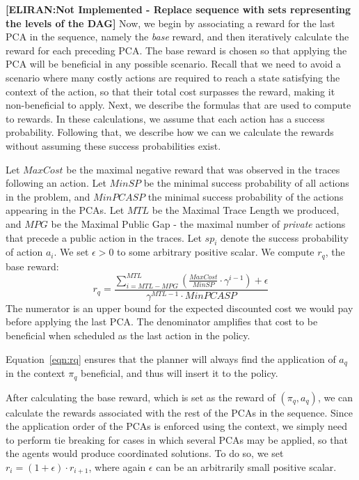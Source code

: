 \documentclass[letterpaper]{article} %
\newcommand{\eliran}[1]{\textbf{[\color{red}ELIRAN:#1]}}
\begin{document}
\eliran{Not Implemented - Replace sequence with sets representing the levels of the DAG}
Now, we begin by associating a reward for the last PCA in the sequence, namely the \emph{base} reward, and then iteratively calculate the reward for each preceding PCA.
The base reward is chosen so that applying the PCA will be beneficial in any possible scenario. Recall that we need to avoid a scenario where many costly actions are required to reach a state satisfying the context of the action, so that their total cost surpasses the reward, making it non-beneficial to apply.
Next, we describe the formulas that are used to compute to rewards. In these calculations, we assume that each action has a success probability. Following that, we describe how we can we calculate the rewards without assuming these success probabilities exist.

Let $MaxCost$ be the maximal negative reward that was observed in the traces following an action. Let $MinSP$ be the minimal success probability of all actions in the problem, and $MinPCASP$ the minimal success probability of the actions appearing in the PCAs. Let $MTL$ be the Maximal Trace Length we produced, and $MPG$ be the Maximal Public Gap - the maximal number of \emph{private} actions that precede a public action in the traces. Let $sp_i$ denote the success probability of action $a_i$. We set $\epsilon > 0$ to some arbitrary positive scalar. We compute $r_q$, the base reward:
\begin{equation}
\label{eqn:rq}
   r_q = \frac{\sum_{i=MTL - MPG}^{MTL}(\frac{MaxCost}{MinSP} \cdot \gamma^{i-1})+ \epsilon}{\gamma^{MTL-1}\cdot MinPCASP} 
\end{equation}%
The numerator is an upper bound for the expected discounted cost we would pay before applying the last PCA. The denominator amplifies that cost to be beneficial when scheduled as the last action in the policy.

Equation~\ref{eqn:rq} ensures that the planner will always find the application of $a_q$ in the context $\pi_q$ beneficial, and thus will insert it to the policy.

After calculating the base reward, which is set as the reward of $(\pi_q, a_q)$, we can calculate the rewards associated with the rest of the PCAs in the sequence. Since the application order of the PCAs is enforced using the context, we simply need to perform tie breaking for cases in which several PCAs may be applied, so that the agents would produce coordinated solutions.
To do so, we set $r_i=(1+\epsilon)\cdot r_{i+1}$, where again $\epsilon$ can be an arbitrarily small positive scalar.
\end{document}
